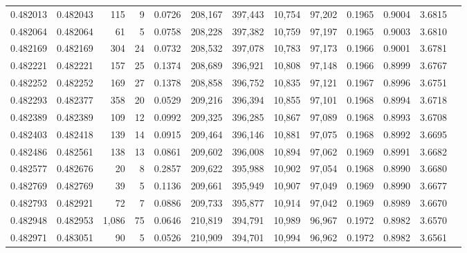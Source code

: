 \begin{tabular}{rrrrrrrrrrrrr}
0.482013 & 0.482043 &   115 &     9 &                                     0.0726 & 208,167 & 397,443 &  10,754 &  97,202 & 0.1965 & 0.9004 & 3.6815 \\
0.482064 & 0.482064 &    61 &     5 &                                     0.0758 & 208,228 & 397,382 &  10,759 &  97,197 & 0.1965 & 0.9003 & 3.6810 \\
0.482169 & 0.482169 &   304 &    24 &                                     0.0732 & 208,532 & 397,078 &  10,783 &  97,173 & 0.1966 & 0.9001 & 3.6781 \\
0.482221 & 0.482221 &   157 &    25 &                                     0.1374 & 208,689 & 396,921 &  10,808 &  97,148 & 0.1966 & 0.8999 & 3.6767 \\
0.482252 & 0.482252 &   169 &    27 &                                     0.1378 & 208,858 & 396,752 &  10,835 &  97,121 & 0.1967 & 0.8996 & 3.6751 \\
0.482293 & 0.482377 &   358 &    20 &                                     0.0529 & 209,216 & 396,394 &  10,855 &  97,101 & 0.1968 & 0.8994 & 3.6718 \\
0.482389 & 0.482389 &   109 &    12 &                                     0.0992 & 209,325 & 396,285 &  10,867 &  97,089 & 0.1968 & 0.8993 & 3.6708 \\
0.482403 & 0.482418 &   139 &    14 &                                     0.0915 & 209,464 & 396,146 &  10,881 &  97,075 & 0.1968 & 0.8992 & 3.6695 \\
0.482486 & 0.482561 &   138 &    13 &                                     0.0861 & 209,602 & 396,008 &  10,894 &  97,062 & 0.1969 & 0.8991 & 3.6682 \\
0.482577 & 0.482676 &    20 &     8 &                                     0.2857 & 209,622 & 395,988 &  10,902 &  97,054 & 0.1968 & 0.8990 & 3.6680 \\
0.482769 & 0.482769 &    39 &     5 &                                     0.1136 & 209,661 & 395,949 &  10,907 &  97,049 & 0.1969 & 0.8990 & 3.6677 \\
0.482793 & 0.482921 &    72 &     7 &                                     0.0886 & 209,733 & 395,877 &  10,914 &  97,042 & 0.1969 & 0.8989 & 3.6670 \\
0.482948 & 0.482953 & 1,086 &    75 &                                     0.0646 & 210,819 & 394,791 &  10,989 &  96,967 & 0.1972 & 0.8982 & 3.6570 \\
0.482971 & 0.483051 &    90 &     5 &                                     0.0526 & 210,909 & 394,701 &  10,994 &  96,962 & 0.1972 & 0.8982 & 3.6561 \\

\end{tabular}
